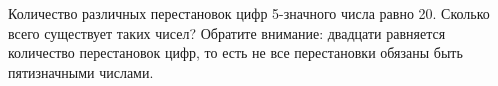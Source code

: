 \question 
Количество различных перестановок цифр 5-значного числа равно 20. Сколько всего существует таких чисел? Обратите внимание: двадцати равняется количество перестановок цифр, то есть не все перестановки обязаны быть пятизначными числами.
